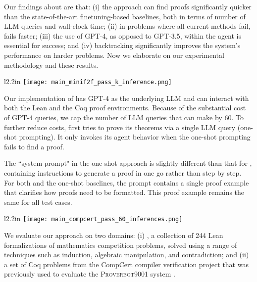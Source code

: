 \newcommand{\minif}{\mathtt{miniF2F}}
\newcommand{\proverbot}{\textsc{Proverbot9001}\xspace}

Our findings about \copra are that: (i) the approach can find proofs significantly quicker than the state-of-the-art finetuning-based baselines, both in terms of number of LLM queries and wall-clock time;  (ii) in problems where all current methods fail, \copra fails faster; (iii) the use of GPT-4, as opposed to GPT-3.5, within the agent is essential for success; and (iv) backtracking significantly improves the system's performance on harder problems. 
Now we elaborate on our experimental methodology and these results. 


\begin{wrapfigure}{l}{2.2in}
\vspace{-0.1in}
  \centering
    \texttt{[image: main\_minif2f\_pass\_k\_inference.png]}
  \caption{\copra vs. \reprover on the  benchmark}
  \label{fig:pass_k_inferences_minif2f}
  \vspace{-0.2in}
\end{wrapfigure}

 Our implementation of \copra has GPT-4 as the underlying LLM and can interact with both the Lean and the Coq proof environments. Because of the substantial cost of GPT-4 queries, 
we cap the number of LLM queries that \copra can make by 60. 
To further reduce costs, \system first tries to prove its theorems via a single LLM query (one-shot prompting).
It only invokes its agent behavior when the one-shot prompting fails to find a proof. 

The ``system prompt" in the one-shot approach is slightly different than that for \copra, containing instructions to generate a proof in one go rather than step by step. For both \copra and the one-shot baselines, the prompt contains a single proof example that clarifies how proofs need to be formatted. 
This proof example remains the same for all test cases.


\begin{wrapfigure}{l}{2.2in}
\vspace{-0.1in}
  \centering
  \texttt{[image: main\_compcert\_pass\_60\_inferences.png]}
  \caption{\copra vs. \proverbot on the Compcert benchmark}
  \label{fig:pass_k_inferences_compcert}
  \vspace{-0.2in}
\end{wrapfigure}

We evaluate our approach on two domains: (i)  \citep{zheng2021minif2f}, a collection of 244 Lean formalizations of mathematics competition problems, solved using a range of techniques such as induction, algebraic manipulation, and contradiction; and (ii) a set of Coq problems from the CompCert compiler verification project \citep{leroy2009formal} that was previously used to evaluate the \proverbot system \citet{sanchez2020generating}. 





